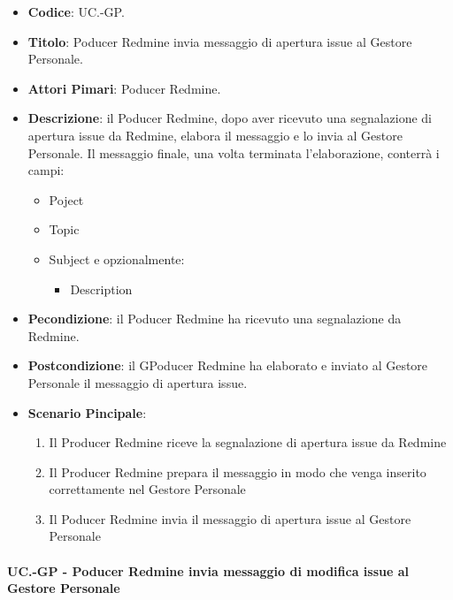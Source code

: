 	\begin{itemize}
		\item \textbf{Codice}: UC\theuccount.\thesubuccount-GP.
		\item \textbf{Titolo}: Poducer Redmine invia messaggio di apertura issue al Gestore Personale.
		\item \textbf{Attori Pimari}: Poducer Redmine.
		\item \textbf{Descrizione}: il Poducer Redmine, dopo aver
		ricevuto una segnalazione di apertura issue da Redmine, elabora il messaggio e lo invia al Gestore Personale.
		Il messaggio finale, una volta terminata l'elaborazione, conterrà i campi:
		\begin{itemize}
			\item Poject
			\item Topic
			\item Subject e opzionalmente:
			\begin{itemize}
				\item Description
			\end{itemize}
		\end{itemize}
		\item \textbf{Pecondizione}: il Poducer Redmine ha ricevuto una segnalazione da Redmine.
		\item \textbf{Postcondizione}: il GPoducer Redmine ha elaborato e inviato al Gestore Personale il messaggio di apertura issue.
		\item \textbf{Scenario Pincipale}: 
		\begin{enumerate}
			\item Il Producer Redmine riceve la segnalazione di apertura issue da Redmine
			\item Il Producer Redmine prepara il messaggio in modo che venga inserito correttamente nel Gestore Personale
			\item Il Poducer Redmine invia il messaggio di
			apertura issue al Gestore Personale
		\end{enumerate}
		
	\end{itemize}
	
	\paragraph{UC\theuccount.\thesubuccount-GP - Poducer Redmine invia messaggio di modifica issue al Gestore Personale}
		
